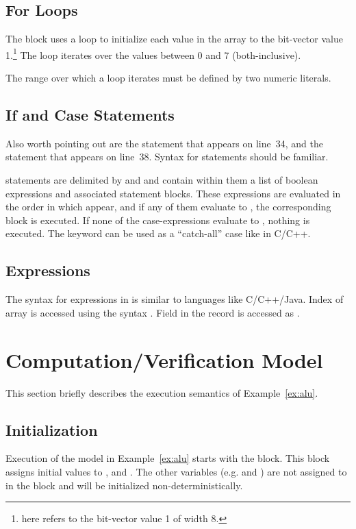 \subsection{For Loops}
The  block uses a  loop to initialize each value in the array  to the bit-vector value 1.\footnote{ here refers to the bit-vector value 1 of width 8.} The loop iterates over the values between 0 and 7 (both-inclusive). 

The range over which a  loop iterates must be defined by two numeric literals.

\subsection{If and Case Statements}
Also worth pointing out are the  statement that appears on line~34, and the  statement that appears on line~38. Syntax for  statements should be familiar. 

 statements are delimited by  and  and contain within them a list of boolean expressions and associated statement blocks. These expressions are evaluated in the order in which appear, and if any of them evaluate to , the corresponding block is executed. If none of the case-expressions evaluate to , nothing is executed. The keyword  can be used as a ``catch-all'' case like in C/C++. 

\subsection{Expressions}

The syntax for expressions in \uclid{} is similar to languages like C/C++/Java. Index  of array  is accessed using the syntax . Field  in the record  is accessed as . 

\section{Computation/Verification Model}
This section briefly describes the execution semantics of Example~\ref{ex:alu}.

\subsection{Initialization}
Execution of the model in Example~\ref{ex:alu} starts with the  block. This block assigns initial values to ,  and . The other variables (e.g.  and ) are not assigned to in the  block and will be initialized non-deterministically.

